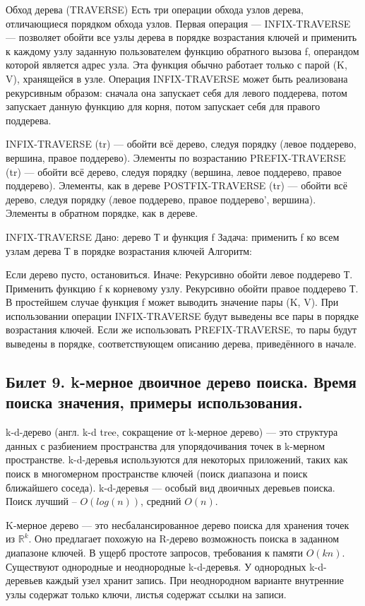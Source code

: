 \documentclass[a4paper, 12pt]{article}
\begin{document}
	Обход дерева (TRAVERSE)
	Есть три операции обхода узлов дерева, отличающиеся порядком обхода узлов.
	Первая операция — INFIX-TRAVERSE — позволяет обойти все узлы дерева в порядке возрастания ключей и применить к каждому узлу заданную пользователем функцию обратного вызова f, операндом которой является адрес узла. Эта функция обычно работает только с парой (K, V), хранящейся в узле. Операция INFIX-TRAVERSE может быть реализована рекурсивным образом: сначала она запускает себя для левого поддерева, потом запускает данную функцию для корня, потом запускает себя для правого поддерева.

	INFIX-TRAVERSE (tr) — обойти всё дерево, следуя порядку (левое поддерево, вершина, правое поддерево). Элементы по возрастанию
	PREFIX-TRAVERSE (tr) — обойти всё дерево, следуя порядку (вершина, левое поддерево, правое поддерево). Элементы, как в дереве
	POSTFIX-TRAVERSE (tr) — обойти всё дерево, следуя порядку (левое поддерево, правое поддерево', вершина). Элементы в обратном порядке, как в дереве.

	INFIX-TRAVERSE
	Дано: дерево Т и функция f
	Задача: применить f ко всем узлам дерева Т в порядке возрастания ключей
	Алгоритм:

	Если дерево пусто, остановиться.
	Иначе:
	Рекурсивно обойти левое поддерево Т.
	Применить функцию f к корневому узлу.
	Рекурсивно обойти правое поддерево Т.
	В простейшем случае функция f может выводить значение пары (K, V). При использовании операции INFIX-TRAVERSE будут выведены все пары в порядке возрастания ключей. Если же использовать PREFIX-TRAVERSE, то пары будут выведены в порядке, соответствующем описанию дерева, приведённого в начале.

	\subsection*{Билет 9.  k-мерное двоичное дерево поиска. Время поиска значения, примеры использования.}
	k-d-дерево (англ. k-d tree, сокращение от k-мерное дерево) — это структура данных с разбиением пространства для упорядочивания точек в k-мерном пространстве. k-d-деревья используются для некоторых приложений, таких как поиск в многомерном пространстве ключей (поиск диапазона и поиск ближайшего соседа). k-d-деревья — особый вид двоичных деревьев поиска.
 	Поиск лучший --	$O(log (n))$, средний $O(n)$.
 	
	K-мерное дерево — это несбалансированное дерево поиска для хранения точек из $\mathbb {R}^{k}$. Оно предлагает похожую на R-дерево возможность поиска в заданном диапазоне ключей. В ущерб простоте запросов, требования к памяти $O(kn)$. Существуют однородные и неоднородные k-d-деревья. У однородных k-d-деревьев каждый узел хранит запись. При неоднородном варианте внутренние узлы содержат только ключи, листья содержат ссылки на записи.
\end{document}
